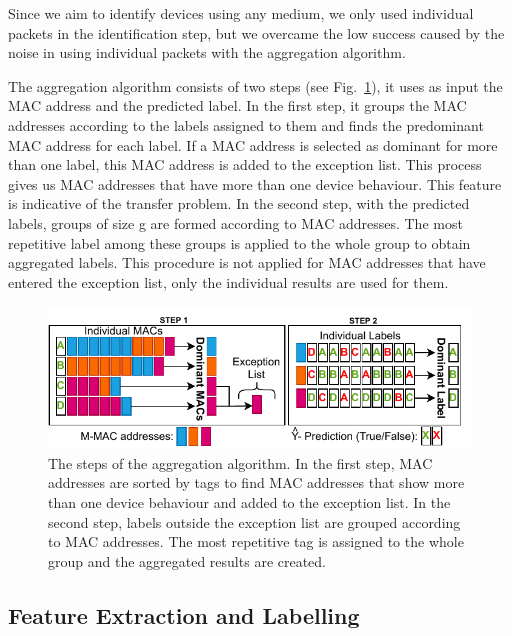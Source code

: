 \documentclass[journal]{IEEEtran}
\begin{document}
Since we aim to identify devices using any medium, we only used individual packets in the identification step, but we overcame the low success caused by the noise in using individual packets with the aggregation algorithm.

The aggregation algorithm consists of two steps (see Fig.~\ref{fig:agg}), it uses as input the MAC address and the predicted label.  In the first step, it groups the MAC addresses according to the labels assigned to them and finds the predominant MAC address for each label. If a MAC address is selected as dominant for more than one label, this MAC address is added to the exception list. This process gives us MAC addresses that have more than one device behaviour. This feature is indicative of the transfer problem. In the second step, with the predicted labels, groups of size g are formed according to MAC addresses. The most repetitive label among these groups is applied to the whole group to obtain aggregated labels. This procedure is not applied for MAC addresses that have entered the exception list, only the individual results are used for them.

\begin{figure}[ht]
	\centerline{\includegraphics[width=1\columnwidth]{images/agregation.pdf}}
	\caption{The steps of the aggregation algorithm. In the first step, MAC addresses are sorted by tags to find MAC addresses that show more than one device behaviour and added to the exception list. In the second step, labels outside the exception list are grouped according to MAC addresses. The most repetitive tag is assigned to the whole group and the aggregated results are created.}
	\label{fig:agg}
\end{figure}



\subsection{Feature Extraction and Labelling}
\end{document}
